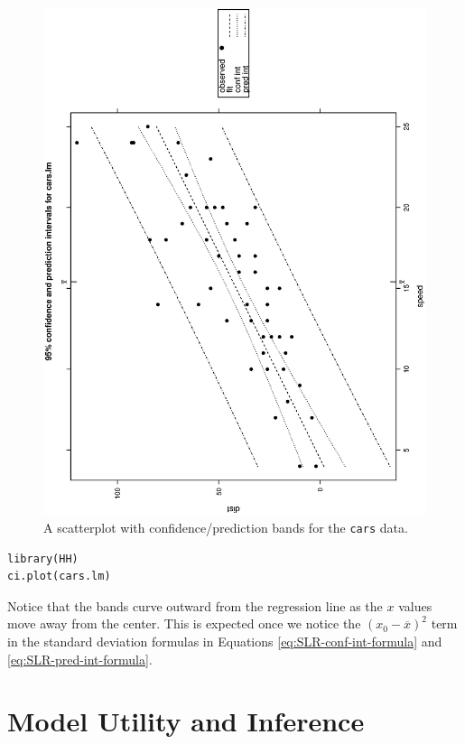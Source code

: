 \documentclass[captions=tableheading]{scrbook}
\begin{document}
\begin{figure}[th]
  \includegraphics[angle=270, totalheight=4in]{ps/carscipi.ps}
  \caption[Scatterplot with confidence/prediction bands for the \texttt{cars} data]{\small A scatterplot with confidence/prediction bands for the \texttt{cars} data.}
  \label{fig:Scatter-cars-CIPI}
\end{figure}


\begin{verbatim}
library(HH)
ci.plot(cars.lm)
\end{verbatim}

Notice that the bands curve outward from the regression line as the \(x\) values move away from the center. This is expected once we notice the \((x_{0}-\overline{x})^{2}\) term in the standard deviation formulas in Equations \ref{eq:SLR-conf-int-formula} and \ref{eq:SLR-pred-int-formula}.
\section{Model Utility and Inference}
\label{sec-11-3}
\end{document}
